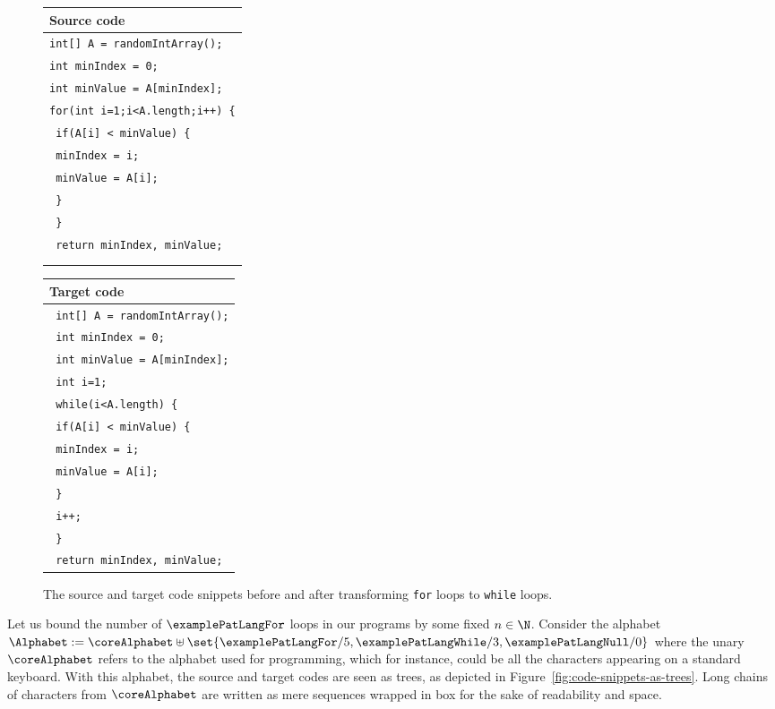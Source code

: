 \begin{figure}
	{\footnotesize
		\begin{tabular}{p{}} 
			Source code \\ \hline
			\texttt{int[] A = randomIntArray();}\\
			\texttt{int minIndex = 0;}\\
			\texttt{int minValue = A[minIndex];}\\
			\texttt{for(int i=1;i<A.length;i++) \{}\\
			\texttt{	\quad if(A[i] < minValue) \{ }\\
			\texttt{	\quad  \quad 	minIndex = i; }\\
			\texttt{	\quad  \quad	minValue = A[i];}\\
			\texttt{	\quad	\} }\\
			\texttt{ \} }\\
			\texttt{ return minIndex, minValue;}\\
			\\
			\\
		\end{tabular}
		\hfil
		\begin{tabular}{p{}} 
			Target code \\
			\hline
			
			\texttt{  int[] A = randomIntArray();}\\
			\texttt{      int minIndex = 0; }\\
			\texttt{ int minValue = A[minIndex];}\\
			\texttt{      int i=1;}\\
			\texttt{  while(i<A.length) \{ }\\
			\texttt{  \quad if(A[i] < minValue) \{ }\\
			\texttt{ \quad \quad       minIndex = i; }\\
			\texttt{ \quad \quad      minValue = A[i]; }\\
			\texttt{ \quad  \} } \\
			\texttt{ \quad i++; }\\
			\texttt{      \} }\\
			\texttt{     return minIndex, minValue;}\\
		\end{tabular}
	}
	\caption{The source and target code snippets before and after transforming \texttt{for} loops to \texttt{while} loops.}\label{fig:code-snippets}
    \Description{}
\end{figure}

Let us bound the number of $\examplePatLangFor$ loops in our programs by some fixed $n \in \N$. Consider the alphabet $\Alphabet := \coreAlphabet \uplus \set{\examplePatLangFor/5, \examplePatLangWhile/3, \examplePatLangNull/0}$ where the unary $\coreAlphabet$ refers to the alphabet used for programming, which for instance, could be all the characters appearing on a standard keyboard. With this alphabet, the source and target codes are seen as trees, as depicted in Figure~\ref{fig:code-snippets-as-trees}. Long chains of characters from $\coreAlphabet$ are written as mere sequences wrapped in box for the sake of readability and space. 

